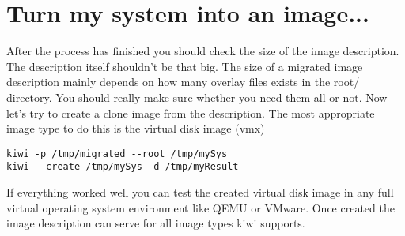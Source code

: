 \section{Turn my system into an image...}
After the process has finished you should check the size of the
image description. The description itself shouldn't be that big.
The size of a migrated image description mainly depends on how many
overlay files exists in the root/ directory. You should really make
sure whether you need them all or not. Now let's try to create a
clone image from the description. The most appropriate image type
to do this is the virtual disk image (vmx)

\begin{Command}{12cm}
\begin{verbatim}
kiwi -p /tmp/migrated --root /tmp/mySys
kiwi --create /tmp/mySys -d /tmp/myResult
\end{verbatim}
\end{Command}

If everything worked well you can test the created virtual disk
image in any full virtual operating system environment like QEMU or
VMware. Once created the image description can serve for all image
types kiwi supports.
 
